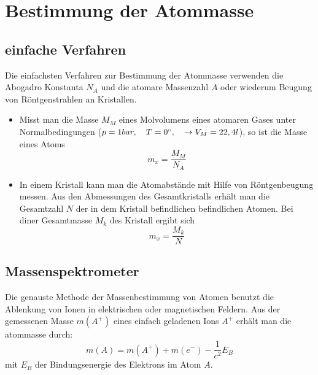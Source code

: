 \section{Bestimmung der Atommasse} %
\label{sec:Bestimmung_der_Atommasse}
\subsection{einfache Verfahren} %
\label{sub:einfache_Verfahren}
Die einfachsten Verfahren zur Bestimmung der Atommasse verwenden die Abogadro
Konstanta $N_A$ und die atomare Massenzahl $A$ oder wiederum Beugung von
Röntgenstrahlen an Kristallen.
\begin{itemize}
    \item Misst man die Masse $M_M$ eines Molvolumens eines atomaren Gases
    unter Normalbedingungen ($p=1bar, \quad T=0^{\circ}, \quad \rightarrow V_M =
    22,4l$), so ist die Masse eines Atoms
    \begin{equation*}
        m_x = \frac{M_M}{N_A}
    \end{equation*}
    \item In einem Kristall kann man die Atomabstände mit Hilfe von
    Röntgenbeugung messen. Aus den Abmessungen des Gesamtkristalls erhält man
    die Gesamtzahl $N$ der in dem Kristall befindlichen befindlichen Atomen.
    Bei diner Gesamtmasse $M_k$ des Kristall ergibt sich
    \begin{equation*}
        m_x = \frac{M_k}{N}
    \end{equation*}
\end{itemize}
\subsection{Massenspektrometer} %
\label{sub:Massenspektrometer}
Die genauste Methode der Massenbestimmung von Atomen benutzt die Ablenkung von
Ionen in elektrischen oder magnetischen Feldern.
Aus der gemessenen Masse $m(A^+)$ eines einfach geladenen Ions $A^+$ erhält man
die atommasse durch:
\begin{equation*}
    m(A) = m(A^+) + m(e^-) - \frac{1}{c^2}E_B
\end{equation*}
mit $E_B$ der Bindungsenergie des Elektrons im Atom $A$.

